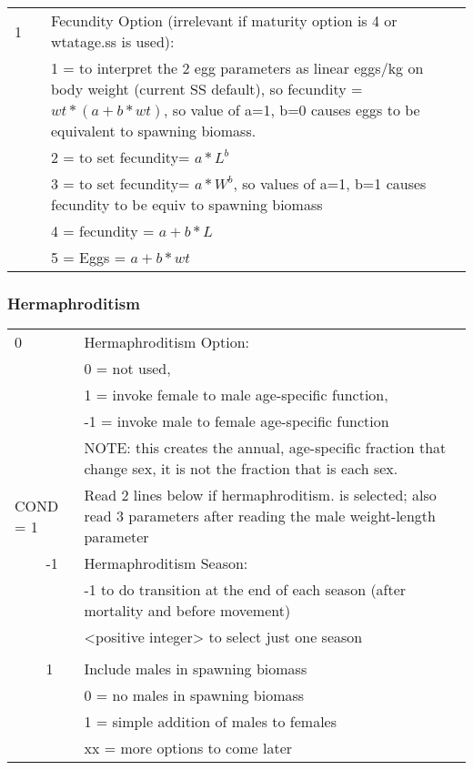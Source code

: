 \begin{longtable}{p{0.5cm} p{2cm} p{12cm}}
	   1 & & Fecundity Option (irrelevant if maturity option is 4 or wtatage.ss is used):\\
	     & & 1 = to  interpret the 2 egg parameters as linear eggs/kg on body weight (current SS default),  so fecundity = $wt * (a+b*wt)$, so value of a=1, b=0 causes eggs to be equivalent to spawning biomass.\\
	     & & 2 = to set fecundity= $a*L^ b$\\
	     & & 3 = to set fecundity= $a*W^ b$, so values of a=1, b=1 causes fecundity to be equiv to spawning biomass\\
	     & & 4 = fecundity = $a+b*L$\\
	     & & 5 = Eggs = $a+b*wt$\\
	  \hline
	\end{longtable}

\subsubsection{Hermaphroditism}


\begin{longtable}{p{0.5cm} p{2cm} p{12cm}}

\hline
	  0 & & Hermaphroditism Option:\\
	   &  & 0 = not used, \\
	   &  & 1 = invoke female to male age-specific function, \\
	   &  & -1 = invoke male to female age-specific function \\
	   &  & NOTE:  this creates the annual, age-specific fraction that change sex, it is not the fraction that is each sex.\\
	  \hline

	  \multicolumn{2}{l}{COND = 1}& Read 2 lines below if hermaphroditism. is selected; also read 3 parameters after reading the male weight-length parameter\\
	  & -1 & Hermaphroditism Season: \\
	  &    & -1 to do transition at the end of each season (after mortality and before movement)\\
	  &    & <positive integer> to select just one season\\
	  \\
	  & 1  & Include males in spawning biomass \\
	  &    & 0 = no males in spawning biomass \\
	  &    & 1 = simple addition of males to females\\
	  &    & xx = more options to come later \\
	  \hline
	\end{longtable}

